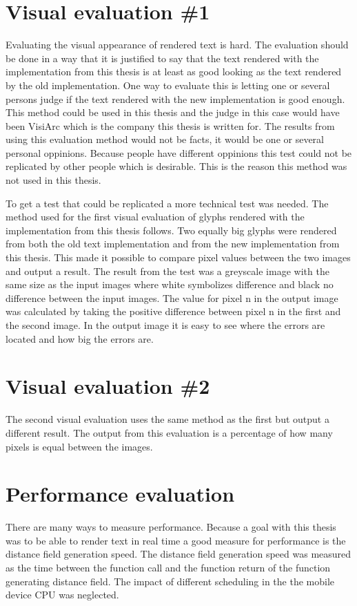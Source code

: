 \section{Visual evaluation \#1}
Evaluating the visual appearance of rendered text is hard. The evaluation should be done in a way that it is justified to say that the text rendered with the implementation from this thesis is at least as good looking as the text rendered by the old implementation. One way to evaluate this is letting one or several persons judge if the text rendered with the new implementation is good enough. This method could be used in this thesis and the judge in this case would have been VisiArc which is the company this thesis is written for. The results from using this evaluation method would not be facts, it would be one or several personal oppinions. Because people have different oppinions this test could not be replicated by other people which is desirable. This is the reason this method was not used in this thesis.

To get a test that could be replicated a more technical test was needed. The method used for the first visual evaluation of glyphs rendered with the implementation from this thesis follows. Two equally big glyphs were rendered from both the old text implementation and from the new implementation from this thesis. This made it possible to compare pixel values between the two images and output a result. The result from the test was a greyscale image with the same size as the input images where white symbolizes difference and black no difference between the input images. The value for pixel n in the output image was calculated by taking the positive difference between pixel n in the first and the second image. In the output image it is easy to see where the errors are located and how big the errors are.
\section{Visual evaluation \#2} 
The second visual evaluation uses the same method as the first but output a different result. The output from this evaluation is a percentage of how many pixels is equal between the images. 
\section{Performance evaluation}
There are many ways to measure performance. Because a goal with this thesis was to be able to render text in real time a good measure for performance is the distance field generation speed. The distance field generation speed was measured as the time between the function call and the function return of the function generating distance field. The impact of different scheduling in the the mobile device CPU was neglected.
